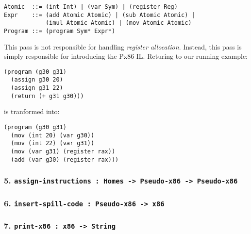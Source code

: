 \documentclass[12pt]{article}
\begin{document}
\begin{verbatim}
Atomic  ::= (int Int) | (var Sym) | (register Reg)
Expr    ::= (add Atomic Atomic) | (sub Atomic Atomic) | 
            (imul Atomic Atomic) | (mov Atomic Atomic)
Program ::= (program Sym* Expr*)
\end{verbatim}

This pass is not responsible for handling \textit{register allocation}. Instead,
this pass is simply responsible for introducing the Px86 IL. Returing to our
running example:
\begin{verbatim}
(program (g30 g31) 
  (assign g30 20)
  (assign g31 22)
  (return (+ g31 g30)))
\end{verbatim}
is tranformed into:
\begin{verbatim}
(program (g30 g31)
  (mov (int 20) (var g30))
  (mov (int 22) (var g31))
  (mov (var g31) (register rax))
  (add (var g30) (register rax)))
\end{verbatim}
\subsubsection*{5. {\tt assign-instructions : Homes -> Pseudo-x86 -> Pseudo-x86}}
\subsubsection*{6. {\tt insert-spill-code : Pseudo-x86 -> x86}}
\subsubsection*{7. {\tt print-x86 : x86 -> String}}
\end{document}
